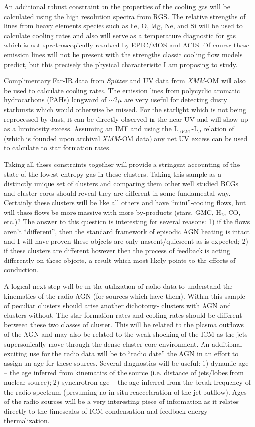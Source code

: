 \documentclass[11pt]{article}
\begin{document}
An additional robust constraint on the properties of the cooling gas
will be calculated using the high resolution spectra from RGS. The
relative strengths of lines from heavy elements species such as Fe, O,
Mg, Ne, and Si will be used to calculate cooling rates and also will
serve as a temperature diagnostic for gas which is not
spectroscopically resolved by EPIC/MOS and ACIS. Of course these
emission lines will not be present with the strengths classic cooling
flow models predict, but this precisely the physical characterisitc I
am proposing to study.

Complimentary Far-IR data from {\it Spitzer} and UV data from {\it
XMM}-OM will also be used to calculate cooling rates. The emission
lines from polycyclic aromatic hydrocarbons (PAHs) longward of
$\sim2\mu$ are very useful for detecting dusty starbursts which
would otherwise be missed. For the starlight which is not being
reprocessed by dust, it can be directly observed in the near-UV and
will show up as a luminosity excess. Assuming an IMF and using the
L$_{UVW1}$-L$_J$ relation of \cite{2005ApJ...635L...9H} (which is
founded upon archival {\it XMM}-OM data) any net UV excess can be
used to calculate to star formation rates.

Taking all these constraints together will provide a stringent
accounting of the state of the lowest entropy gas in these
clusters. Taking this sample as a distinctly unique set of clusters
and comparing them other well studied BCGs and cluster cores should
reveal they are different in some fundamental way. Certainly these
clusters will be like all others and have ``mini''-cooling flows, but
will these flows be more massive with more by-products (stars, GMC,
H$_2$, CO, etc.)? The answer to this question is interesting for
several reasons: 1) if the flows aren't ``different'', then the standard framework
of episodic AGN heating is intact and I will have proven these objects
are only nascent/quiescent as is expected; 2) if these clusters are different
however then the process of feedback is acting differently on these
objects, a result which most likely points to the effects of
conduction.

A logical next step will be in the utilization of radio data to
understand the kinematics of the radio AGN (for sources which have
them). Within this sample of peculiar clusters should arise another
dichotomy- clusters with AGN and clusters without. The star formation
rates and cooling rates should be different between these two classes
of cluster. This will be related to the plasma outflows of the AGN and
may also be related to the weak shocking of the ICM as the jets
supersonically move through the dense cluster core environment. An
additional exciting use for the radio data will be to ``radio date''
the AGN in an effort to assign an age for these sources. Several
diagnostics will be useful: 1) dynamic age -- the age inferred from
kinematics of the source (i.e. distance of jets/lobes from nuclear
source); 2) synchrotron age -- the age inferred from the break frequency
of the radio spectrum (presuming no in situ reacceleration of the jet
outflow). Ages of the radio sources will be a very interesting piece
of information as it relates directly to the timescales of ICM
condensation and feedback energy thermalization.
\end{document}
